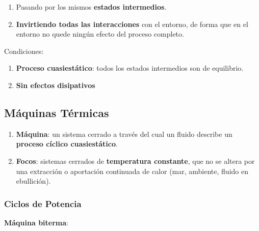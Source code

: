         \begin{enumerate}
            \item Pasando por los mismos \textbf{estados intermedios}.
            \item \textbf{Invirtiendo todas las interacciones} con el entorno, de forma que en el entorno no quede ningún efecto del proceso completo.
        \end{enumerate}
        
        Condiciones:
        
        \begin{enumerate}
            \item \textbf{Proceso cuasiestático}: todos los estados intermedios son de equilibrio.
            \item \textbf{Sin efectos disipativos}
        \end{enumerate}
    
    \subsection{Máquinas Térmicas}
    
    \begin{quote}
        \textit{}
    \end{quote}
    
    \begin{enumerate}
        \item \textbf{Máquina}: un sistema cerrado a través del cual un fluido describe un \textbf{proceso cíclico cuasiestático}.
        \item \textbf{Focos}: sistemas cerrados de \textbf{temperatura constante}, que no se altera por una extracción o aportación continuada de calor (mar, ambiente, fluido en ebullición).
    \end{enumerate}
    
        \subsubsection{Ciclos de Potencia}
        
        \begin{quote}
            \textit{}
        \end{quote}
        
        \textbf{Máquina biterma}:
        

